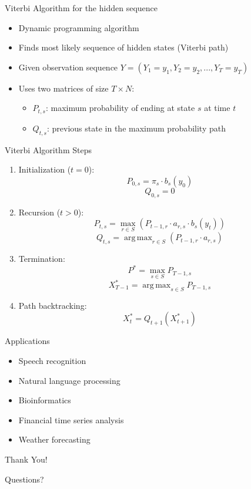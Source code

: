 \documentclass{beamer}
\DeclareMathOperator*{\argmax}{arg\,max}
\begin{document}
\begin{frame}{Viterbi Algorithm for the hidden sequence}
    \begin{itemize}
        \item Dynamic programming algorithm
        \item Finds most likely sequence of hidden states (Viterbi path)
        \item Given observation sequence $Y = (Y_1=y_1, Y_2=y_2, ..., Y_T=y_T)$
        \item Uses two matrices of size $T \times N$:
        \begin{itemize}
            \item $P_{t,s}$: maximum probability of ending at state $s$ at time $t$
            \item $Q_{t,s}$: previous state in the maximum probability path
        \end{itemize}
    \end{itemize}
\end{frame}

\begin{frame}{Viterbi Algorithm Steps}
    \begin{enumerate}
        \item Initialization ($t=0$):
        \[P_{0,s} = \pi_s \cdot b_s(y_0)\]
        \[Q_{0,s} = 0\]
        
        \item Recursion ($t>0$):
        \[P_{t,s} = \max_{r \in S} (P_{t-1,r} \cdot a_{r,s} \cdot b_s(y_t))\]
        \[Q_{t,s} = \argmax_{r \in S} (P_{t-1,r} \cdot a_{r,s})\]
        
        \item Termination:
        \[P^* = \max_{s \in S} P_{T-1,s}\]
        \[X_{T-1}^* = \argmax_{s \in S} P_{T-1,s}\]
        
        \item Path backtracking:
        \[X_t^* = Q_{t+1}(X_{t+1}^*)\]
    \end{enumerate}
\end{frame}
\begin{frame}{Applications}
    \begin{itemize}
        \item Speech recognition
        \item Natural language processing
        \item Bioinformatics
        \item Financial time series analysis
        \item Weather forecasting
    \end{itemize}
\end{frame}
\begin{frame}{Thank You!}
    \begin{center}
        Questions?
    \end{center}
\end{frame}
\end{document}
